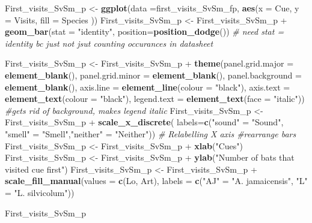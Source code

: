 \documentclass[]{article}
\newenvironment{Shaded}{\begin{snugshade}}{\end{snugshade}}
\newcommand{\KeywordTok}[1]{\textcolor[rgb]{0.13,0.29,0.53}{\textbf{{#1}}}}
\newcommand{\DataTypeTok}[1]{\textcolor[rgb]{0.13,0.29,0.53}{{#1}}}
\newcommand{\StringTok}[1]{\textcolor[rgb]{0.31,0.60,0.02}{{#1}}}
\newcommand{\CommentTok}[1]{\textcolor[rgb]{0.56,0.35,0.01}{\textit{{#1}}}}
\newcommand{\NormalTok}[1]{{#1}}
\begin{document}
\begin{Shaded}
\begin{Highlighting}[]
\NormalTok{First_visits_SvSm_p <-}\StringTok{ }\KeywordTok{ggplot}\NormalTok{(}\DataTypeTok{data =}\NormalTok{first_visits_SvSm_fp, }\KeywordTok{aes}\NormalTok{(}\DataTypeTok{x =} \NormalTok{Cue, }\DataTypeTok{y =} \NormalTok{Visits, }\DataTypeTok{fill =} \NormalTok{Species ))}
\NormalTok{First_visits_SvSm_p <-}\StringTok{ }\NormalTok{First_visits_SvSm_p +}\StringTok{ }\KeywordTok{geom_bar}\NormalTok{(}\DataTypeTok{stat =} \StringTok{"identity"}\NormalTok{, }\DataTypeTok{position=}\KeywordTok{position_dodge}\NormalTok{()) }\CommentTok{# need stat = identity bc just not jsut counting occurances in datasheet}

\NormalTok{First_visits_SvSm_p  <-}\StringTok{ }\NormalTok{First_visits_SvSm_p  +}\StringTok{ }\KeywordTok{theme}\NormalTok{(}\DataTypeTok{panel.grid.major =} \KeywordTok{element_blank}\NormalTok{(), }\DataTypeTok{panel.grid.minor =} \KeywordTok{element_blank}\NormalTok{(),}
\DataTypeTok{panel.background =} \KeywordTok{element_blank}\NormalTok{(), }\DataTypeTok{axis.line =} \KeywordTok{element_line}\NormalTok{(}\DataTypeTok{colour =} \StringTok{"black"}\NormalTok{), }\DataTypeTok{axis.text =} \KeywordTok{element_text}\NormalTok{(}\DataTypeTok{colour =} \StringTok{"black"}\NormalTok{), }\DataTypeTok{legend.text =} \KeywordTok{element_text}\NormalTok{(}\DataTypeTok{face =} \StringTok{"italic"}\NormalTok{))  }\CommentTok{#gets rid of background, makes legend italic}
\NormalTok{First_visits_SvSm_p  <-}\StringTok{ }\NormalTok{First_visits_SvSm_p  +}\StringTok{ }\KeywordTok{scale_x_discrete}\NormalTok{( }\DataTypeTok{labels=}\KeywordTok{c}\NormalTok{(}\StringTok{"sound"} \NormalTok{=}\StringTok{ "Sound"}\NormalTok{, }\StringTok{"smell"} \NormalTok{=}\StringTok{ "Smell"}\NormalTok{,}\StringTok{"neither"} \NormalTok{=}\StringTok{ "Neither"}\NormalTok{))  }\CommentTok{# Relabelling X axis #rearrange bars}
\NormalTok{First_visits_SvSm_p  <-}\StringTok{ }\NormalTok{First_visits_SvSm_p  +}\StringTok{ }\KeywordTok{xlab}\NormalTok{(}\StringTok{"Cues"}\NormalTok{)}
\NormalTok{First_visits_SvSm_p  <-}\StringTok{ }\NormalTok{First_visits_SvSm_p  +}\StringTok{ }\KeywordTok{ylab}\NormalTok{(}\StringTok{"Number of bats that visited cue first"}\NormalTok{)}
\NormalTok{First_visits_SvSm_p  <-}\StringTok{ }\NormalTok{First_visits_SvSm_p  +}\StringTok{ }\KeywordTok{scale_fill_manual}\NormalTok{(}\DataTypeTok{values =} \KeywordTok{c}\NormalTok{(Lo, Art), }\DataTypeTok{labels =} \KeywordTok{c}\NormalTok{(}\StringTok{"AJ"} \NormalTok{=}\StringTok{ "A. jamaicensis"}\NormalTok{, }\StringTok{"L"} \NormalTok{=}\StringTok{ "L. silvicolum"}\NormalTok{))}

\NormalTok{First_visits_SvSm_p}
\end{Highlighting}
\end{Shaded}
\end{document}
